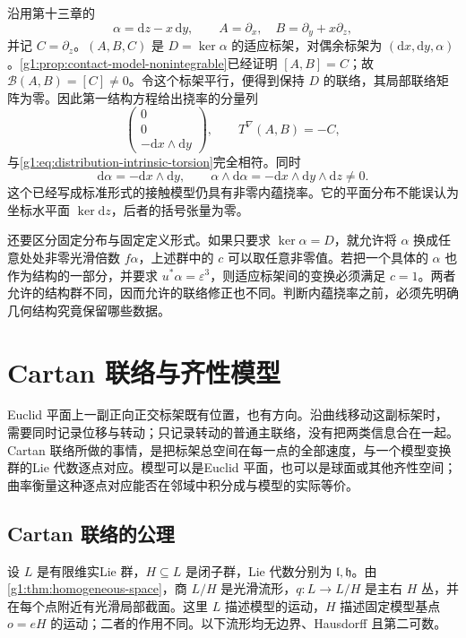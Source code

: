 \begin{example}
	\label{g1:exm:contact-intrinsic-torsion}
	沿用第十三章的
	\[
		\alpha=\mathrm{d}z-x\,\mathrm{d}y,\qquad
		A=\partial_x,\quad B=\partial_y+x\partial_z,
	\]
	并记 \(C=\partial_z\)。\((A,B,C)\) 是 \(D=\ker\alpha\) 的适应标架，对偶余标架为 \((\mathrm{d}x,\mathrm{d}y,\alpha)\)。\cref{g1:prop:contact-model-nonintegrable}已经证明 \([A,B]=C\)；故 \(\mathcal B(A,B)=[C]\neq0\)。令这个标架平行，便得到保持 \(D\) 的联络，其局部联络矩阵为零。因此第一结构方程给出挠率的分量列
	\[
		\begin{pmatrix}0\\0\\-\mathrm{d}x\wedge\mathrm{d}y\end{pmatrix},
		\qquad T^\nabla(A,B)=-C,
	\]
	与\eqref{g1:eq:distribution-intrinsic-torsion}完全相符。同时
	\[
		\mathrm{d}\alpha=-\mathrm{d}x\wedge\mathrm{d}y,
		\qquad
		\alpha\wedge\mathrm{d}\alpha
		=-\mathrm{d}x\wedge\mathrm{d}y\wedge\mathrm{d}z\neq0.
	\]
	这个已经写成标准形式的接触模型仍具有非零内蕴挠率。它的平面分布不能误认为坐标水平面 \(\ker\mathrm{d}z\)，后者的括号张量为零。
\end{example}

还要区分固定分布与固定定义形式。如果只要求 \(\ker\alpha=D\)，就允许将 \(\alpha\) 换成任意处处非零光滑倍数 \(f\alpha\)，上述群中的 \(c\) 可以取任意非零值。若把一个具体的 \(\alpha\) 也作为结构的一部分，并要求 \(u^*\alpha=\varepsilon^3\)，则适应标架间的变换必须满足 \(c=1\)。两者允许的结构群不同，因而允许的联络修正也不同。判断内蕴挠率之前，必须先明确几何结构究竟保留哪些数据。

\section{Cartan 联络与齐性模型}
\label{g1:sec:D02}

Euclid 平面上一副正向正交标架既有位置，也有方向。沿曲线移动这副标架时，需要同时记录位移与转动；只记录转动的普通主联络，没有把两类信息合在一起。Cartan 联络所做的事情，是把标架总空间在每一点的全部速度，与一个模型变换群的Lie 代数逐点对应。模型可以是Euclid 平面，也可以是球面或其他齐性空间；曲率衡量这种逐点对应能否在邻域中积分成与模型的实际等价。

\subsection{Cartan 联络的公理}
\label{g1:subsec:D02:01}

设 \(L\) 是有限维实Lie 群，\(H\subseteq L\) 是闭子群，Lie 代数分别为 \(\mathfrak l,\mathfrak h\)。由\cref{g1:thm:homogeneous-space}，商 \(L/H\) 是光滑流形，\(q:L\to L/H\) 是主右 \(H\) 丛，并在每个点附近有光滑局部截面。这里 \(L\) 描述模型的运动，\(H\) 描述固定模型基点 \(o=eH\) 的运动；二者的作用不同。以下流形均无边界、Hausdorff 且第二可数。

